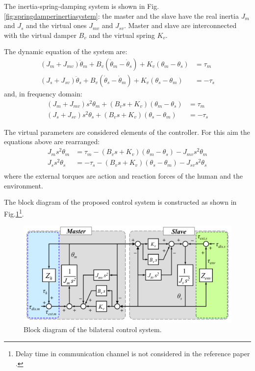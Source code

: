 The inertia-spring-damping system is shown in Fig.\ref{fig:springdamperinertiasystem}: the master and the slave have the real inertia $ J_m $ and $ J_s $ and the virtual ones $ J_{mv} $ and $ J_{sv} $. Master and slave are interconnected with the virtual damper $ B_v $ and the virtual spring $ K_v $.

The dynamic equation of the system are:
\begin{align}
	(J_m + J_{mv})\ddot{\theta}_m + B_v (\dot{\theta}_m - \dot{\theta}_s) + K_v(\theta_m - \theta_s) &= \tau_m \\
	(J_s + J_{sv})\ddot{\theta}_s + B_v (\dot{\theta}_s - \dot{\theta}_m) + K_v(\theta_s - \theta_m) &= - \tau_s 
\end{align}
and, in frequency domain:
\begin{align}
	(J_m + J_{mv}) s^2 \theta_m + (B_v s + K_v) (\theta_m - \theta_s) &= \tau_m \\
	(J_s + J_{sv}) s^2 \theta_s + (B_v s + K_v) (\theta_s - \theta_m) &= - \tau_s 
\end{align}

The virtual parameters are considered elements of the controller. For this aim the equations above are rearranged:
\begin{align}
	J_m s^2 \theta_m &= \tau_m - (B_v s + K_v) (\theta_m - \theta_s) - J_{mv} s^2 \theta_m \\
	J_s s^2 \theta_s &= - \tau_s - (B_v s + K_v) (\theta_s - \theta_m) - J_{sv} s^2 \theta_s \\
\end{align}
where the external torques are action and reaction forces of the human and the environment.

The block diagram of the proposed control system is constructed as shown in Fig.\ref{fig:blockdiagram}\footnote{Delay time in communication channel is not considered in the reference paper \cite{trakarnchaiyo2017vibration}.}.

\begin{figure}
	\centering
	\includegraphics[width=0.7\linewidth]{Images/Block_diagram}
	\caption[block_diagram]{Block diagram of the bilateral control system.}
	\label{fig:blockdiagram}
\end{figure}

